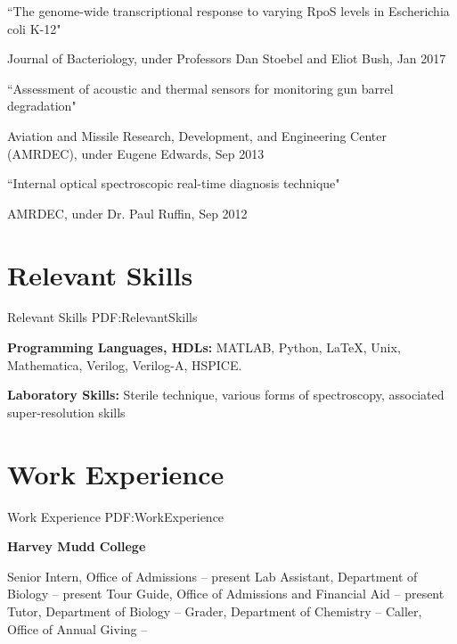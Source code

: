 \documentclass[letterpaper,10pt,oneside]{article}
\begin{document}
\begin{body}
\BulletItemBullet
``The genome-wide transcriptional response to varying RpoS levels in Escherichia coli K-12"
\begin{detail}
\SubBulletItem
Journal of Bacteriology, under Professors Dan Stoebel and Eliot Bush, Jan 2017
\end{detail}

\Gap

\BulletItemBullet
``Assessment of acoustic and thermal sensors for monitoring gun barrel degradation"
\begin{detail}
\SubBulletItem
Aviation and Missile Research, Development, and Engineering Center (AMRDEC), under Eugene Edwards, Sep 2013
\end{detail}

\Gap

\BulletItemBullet
``Internal optical spectroscopic real-time diagnosis technique"
\begin{detail}
\SubBulletItem
AMRDEC, under Dr. Paul Ruffin, Sep 2012
\end{detail}


\section
{Relevant Skills}
{Relevant Skills}
{PDF:RelevantSkills}

{\textbf{Programming Languages, HDLs:}}
MATLAB, Python, \LaTeX, Unix, Mathematica, Verilog, Verilog-A, HSPICE.

\Gap

{\textbf{Laboratory Skills:}}
Sterile technique, various forms of spectroscopy, associated super-resolution skills


\section
{Work Experience}
{Work Experience}
{PDF:WorkExperience}

{\textbf{Harvey Mudd College}}

\GapNoBreak
\BulletItem
Senior Intern, Office of Admissions \hfill
{} --
present
\BulletItem
Lab Assistant, Department of Biology \hfill
{} --
present
\BulletItem
Tour Guide, Office of Admissions and Financial Aid \hfill
{} --
present
\BulletItem
Tutor, Department of Biology \hfill
{} --
\BulletItem
Grader, Department of Chemistry \hfill
{} --
\BulletItem
Caller, Office of Annual Giving \hfill
{} --


\end{body}
\end{document}
